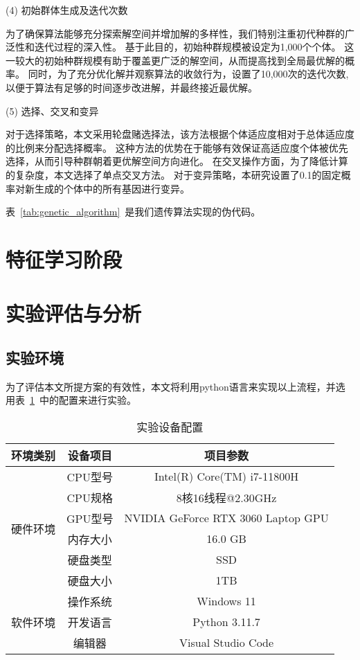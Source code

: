 (4) 初始群体生成及迭代次数\par
为了确保算法能够充分探索解空间并增加解的多样性，我们特别注重初代种群的广泛性和迭代过程的深入性。
基于此目的，初始种群规模被设定为1,000个个体。
这一较大的初始种群规模有助于覆盖更广泛的解空间，从而提高找到全局最优解的概率。
同时，为了充分优化解并观察算法的收敛行为，设置了10,000次的迭代次数,以便于算法有足够的时间逐步改进解，并最终接近最优解。\par



(5) 选择、交叉和变异\par
对于选择策略，本文采用轮盘赌选择法，该方法根据个体适应度相对于总体适应度的比例来分配选择概率。
这种方法的优势在于能够有效保证高适应度个体被优先选择，从而引导种群朝着更优解空间方向进化。
在交叉操作方面，为了降低计算的复杂度，本文选择了单点交叉方法。
对于变异策略，本研究设置了0.1的固定概率对新生成的个体中的所有基因进行变异。

表~\ref{tab:genetic_algorithm}~是我们遗传算法实现的伪代码。



\section{特征学习阶段}

\section{实验评估与分析}
\subsection{实验环境}
为了评估本文所提方案的有效性，本文将利用python语言来实现以上流程，并选用表~\ref{tab:env_setting}~中的配置来进行实验。
\begin{table}[htbp]
  \caption{实验设备配置}
  \label{tab:env_setting}
  \centering
  \begin{tabular}{ccc}
    \toprule
    \textbf{环境类别} & \textbf{设备项目} & \textbf{项目参数}\\
    \midrule
    \multirow{6}{*}{硬件环境}& CPU型号 & Intel(R) Core(TM) i7-11800H\\
                            & CPU规格 & 8核16线程@2.30GHz\\
                            & GPU型号 & NVIDIA GeForce RTX 3060 Laptop GPU\\
                            & 内存大小& 16.0 GB\\
                            & 硬盘类型& SSD\\
                            & 硬盘大小& 1TB\\
                            \hline
    \multirow{3}{*}{软件环境}&操作系统&Windows 11\\
                            &开发语言&Python 3.11.7\\
                            &编辑器 &Visual Studio Code\\                       
    \bottomrule
  \end{tabular}
\end{table}

